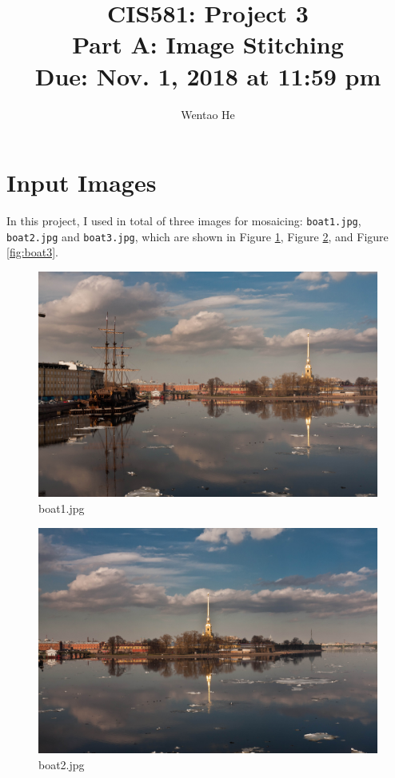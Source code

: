 \documentclass[english]{article}
\title{CIS581: Project 3\\Part A: Image Stitching\\Due: Nov. 1, 2018 at 11:59 pm}
\author{Wentao He}
\begin{document}
\maketitle
\section{Input Images}
In this project, I used in total of three images for mosaicing: \texttt{boat1.jpg}, \texttt{boat2.jpg} and \texttt{boat3.jpg}, which are shown in Figure \ref{fig:boat1}, Figure \ref{fig:boat2}, and Figure \ref{fig:boat3}.
        \begin{figure}[H]
          \centering
          \includegraphics[width=1\textwidth]{boat1.jpg}
          \caption{boat1.jpg}
          \label{fig:boat1}
        \end{figure}
        \begin{figure}[H]
          \centering
          \includegraphics[width=1\textwidth]{boat2.jpg}
          \caption{boat2.jpg}
          \label{fig:boat2}
          \end{figure}
\end{document}
